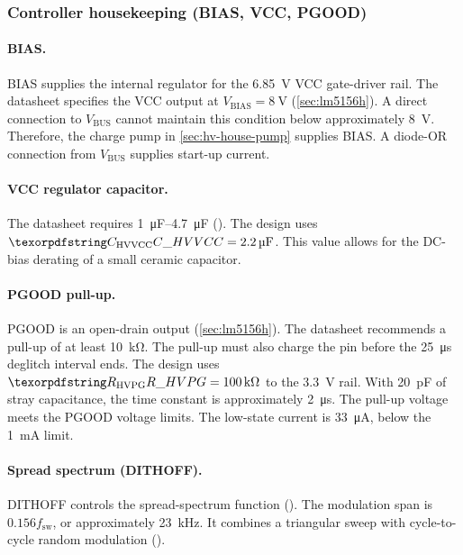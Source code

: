 \subsubsection{Controller housekeeping (BIAS, VCC, PGOOD)}\label{sec:hv-house}

\paragraph{BIAS.}\label{sec:hv-house-bias}
BIAS supplies the internal regulator for the \SI{6.85}{\volt} VCC gate-driver
rail. The datasheet specifies the VCC output at
$V_{\mathrm{BIAS}} = \SI{8}{\volt}$ (\cref{sec:lm5156h}). A direct connection
to $V_{\mathrm{BUS}}$ cannot maintain this condition below approximately
\SI{8}{\volt}. Therefore, the charge pump in \cref{sec:hv-house-pump} supplies
BIAS. A diode-OR connection from $V_{\mathrm{BUS}}$ supplies start-up current.

\paragraph{VCC regulator capacitor.}\label{sec:hv-house-vcc} The datasheet
requires \SIrange{1}{4.7}{\micro\farad} (). The design uses
$\des{C}{HVVCC} = \SI{2.2}{\micro\farad}$. This value allows for the DC-bias
derating of a small ceramic capacitor.

\paragraph{PGOOD pull-up.}\label{sec:hv-house-pgood} PGOOD is an open-drain
output (\cref{sec:lm5156h}). The datasheet recommends a pull-up of at least
\SI{10}{\kilo\ohm}. The pull-up must also charge the pin before the
\SI{25}{\micro\second} deglitch interval ends. The design uses
$\des{R}{HVPG} = \SI{100}{\kilo\ohm}$ to the 3.3~V rail. With
\SI{20}{\pico\farad} of stray capacitance, the time constant is approximately
\SI{2}{\micro\second}. The pull-up voltage meets the PGOOD voltage limits. The
low-state current is \SI{33}{\micro\ampere}, below the
\SI{1}{\milli\ampere} limit.

\paragraph{Spread spectrum (DITHOFF).}\label{sec:hv-house-dithoff}
DITHOFF controls the spread-spectrum function (). The
modulation span is $0.156 f_{\mathrm{sw}}$, or approximately
\SI{23}{\kilo\hertz}. It combines a triangular sweep with cycle-to-cycle random
modulation ().

